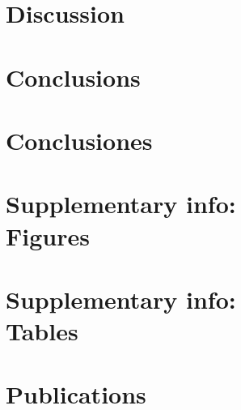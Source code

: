 \documentclass[12pt,twoside,openright]{book}
\begin{document}
\chapter{Discussion}


%

\chapter{Conclusions}



\chapter*{Conclusiones}



{}



\begin{appendices}

\renewcommand\thefigure{\thechapter.\arabic{figure}}
\setcounter{figure}{1}
\renewcommand\thetable{\thechapter.\arabic{table}}
\setcounter{table}{1}

\chapter[Supplementary info: Figures]{Supplementary info:\\ Figures}

\cleardoublepage



\cleardoublepage

\chapter[Supplementary info: Tables]{Supplementary info:\\Tables}

\cleardoublepage

\newpage


\chapter{Publications} \label{a_publications}

\cleardoublepage

\cleardoublepage

\cleardoublepage

\cleardoublepage

\cleardoublepage

\cleardoublepage

\newpage %
\thispagestyle{empty}
    \mbox{}

\end{appendices}
\end{document}
